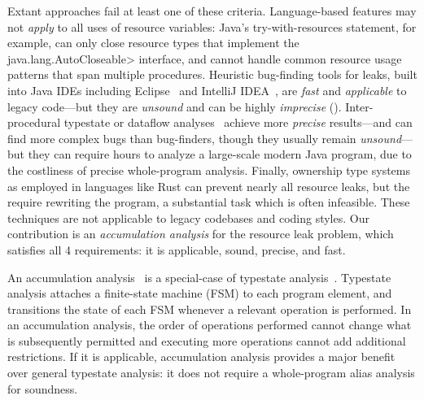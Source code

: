 Extant approaches fail at least one of these criteria.
Language-based features may not \emph{apply} to all uses of resource variables:
Java's try-with-resources statement, for example, can
only close resource types that implement the \<java.lang.AutoCloseable> interface,
and cannot handle
common resource usage patterns that span multiple procedures.
Heuristic bug-finding tools for leaks, built into Java IDEs including
Eclipse~\cite{ecj-resource-leak} and IntelliJ
IDEA~\cite{idea-resource-leak}, 
are \emph{fast} and \emph{applicable} to legacy
code---but they are \emph{unsound} and can be highly \emph{imprecise}
().  
Inter-procedural typestate or dataflow analyses~\cite{TorlakC10,zuo2019grapple}
achieve more \emph{precise}
results---and
can find more complex bugs than bug-finders, though they usually remain
\emph{unsound}---but
they can require hours to analyze a large-scale modern Java program, due
to the costliness of precise whole-program analysis.    Finally, ownership type
systems~\cite{clarke2013ownership} as employed in languages like Rust
 can prevent nearly all resource leaks, but the require
rewriting the program, a substantial task which is often infeasible.
These techniques are not applicable to legacy codebases and coding styles.
Our contribution is an \emph{accumulation analysis} for the resource leak
problem, which satisfies all 4 requirements:  it is applicable,
sound, precise, and fast.

An accumulation analysis~\cite{KelloggRSSE2020}
is a special-case of typestate analysis~\cite{StromY86}.
Typestate analysis attaches a finite-state machine (FSM)
to each program element, and transitions the state of each
FSM whenever a relevant operation is performed.
In an accumulation analysis,
the order of operations performed cannot change what is subsequently
permitted and executing more operations cannot add additional
restrictions.  If it is applicable, accumulation analysis provides a major
benefit over general typestate analysis: it does not
require a whole-program alias analysis for soundness.


